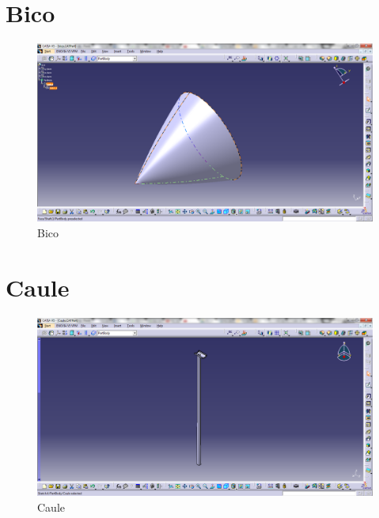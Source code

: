 
\section{Bico}
  \begin{figure}[!htbp]
	  \centering
	  \includegraphics[scale=0.45]{editaveis/figuras/C_Bico}
	  \caption[Bico]{Bico}
	  \label{Bico}
	\end{figure}
	\FloatBarrier

\section{Caule}
\begin{figure}[!htbp]
	  \centering
	  \includegraphics[scale=0.45]{editaveis/figuras/C_Caule_1}
	  \caption[Caule]{Caule}
	  \label{Caule1}
	\end{figure}
	\FloatBarrier

